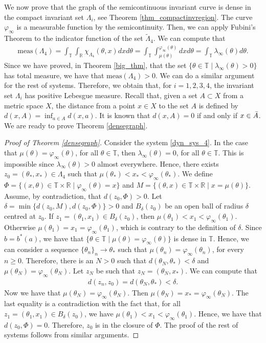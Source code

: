 \documentclass[12pt]{article}
\newcommand{\T}{\mathbb{T}}
\newcommand{\R}{\mathbb{R}}
\theoremstyle{plain}
\theoremstyle{remark}
\theoremstyle{definition}
\begin{document}
We now prove that the graph of the semicontinuous invariant curve is dense in the compact invariant set $\Lambda_i$, see Theorem \ref{thm_compactinvregion}. The curve $\varphi_\infty$ is a measurable function by the semicontinuity. Then, we can apply Fubini's Theorem to the indicator function of the set $\tilde{\Lambda}_4$. We can compute that
\begin{align*}
    \text{meas}(\Lambda_4)=\int_\T\int_{\R}\chi_{\Lambda_4}(\theta,x) dx d\theta = \int_\T\int_{\mu(\theta)}^{\varphi_\infty(\theta)}dx d\theta = \int_\T \lambda_\infty(\theta)d\theta.
\end{align*}
Since we have proved, in Theorem \ref{big_thm}, that the set $\{\theta\in\T\mid \lambda_\infty(\theta)>0\}$ has total measure, we have that $\text{meas}(\Lambda_4)>0$. We can do a similar argument for the rest of systems. Therefore, we obtain that, for $i=1,2,3,4$, the invariant set $\Lambda_i$ has positive Lebesgue measure.
Recall that, given a set $A\subset X$ from a metric space $X$, the distance from a point $x\in X$ to the set $A$ is defined by $d(x,A)=\inf_{a\in A}d(x,a)$. It is known that $d(x,A)=0$ if and only if $x\in\Bar{A}$. We are ready to prove Theorem \ref{densegraph}.
\begin{proof}[Proof of Theorem \ref{densegraph}]
     Consider the system \eqref{dyn_sys_4}. In the case that $\mu(\theta)=\varphi_\infty(\theta)$, for all $\theta\in\T$, then $\lambda_\infty(\theta)=0$, for all $\theta\in\T$. This is impossible since $\lambda_\infty(\theta)>0$ almost everywhere. Hence, there exists $z_0=(\theta_*,x_*)\in\Lambda_4$ such that $\mu(\theta_*)<x_*<\varphi_\infty(\theta_*)$. We define $\Phi=\{(x,\theta)\in\T\times\R\mid\varphi_\infty(\theta)=x\}$ and $M=\{(\theta,x)\in\T\times\R\mid x = \mu(\theta)\}$. Assume, by contradiction, that $d(z_0,\Phi)>0$. Let $\delta=\min\{d(z_0,M),d(z_0,\Phi)\}>0$ and $B_\delta(z_0)$ be an open ball of radius $\delta$ centred at $z_0$. If $z_1=(\theta_1,x_1)\in B_\delta(z_0)$, then $\mu(\theta_1)<x_1<\varphi_\infty(\theta_1)$. Otherwise $\mu(\theta_1)=x_1=\varphi_\infty(\theta_1)$, which is contrary to the definition of $\delta$. Since $b=b^*(a)$, we have that $\{\theta\in\T\mid \mu(\theta)=\varphi_\infty(\theta)\}$ is dense in $\T$. Hence, we can consider a sequence $\{\theta_n\}_n\to\theta_*$ such that $\mu(\theta_n)=\varphi_\infty(\theta_n)$, for every $n\geq0$. Therefore, there is an $N>0$ such that $d(\theta_N,\theta_*)<\delta$ and $\mu(\theta_N)=\varphi_\infty(\theta_N)$. Let $z_N$ be such that $z_N=(\theta_N,x_*)$. We can compute that 
     \begin{align*}
        d(z_n,z_0) = d(\theta_N,\theta_*) < \delta.
     \end{align*}
     Now we have that $\mu(\theta_N)=\varphi_\infty(\theta_N)$. Then $\mu(\theta_N)=x_*=\varphi_\infty(\theta_N)$. The last equality is a contradiction with the fact that, for all $z_1=(\theta_1,x_1)\in B_\delta(z_0)$, we have $\mu(\theta_1)<x_1<\varphi_\infty(\theta_1)$. Hence, we have that $d(z_0,\Phi)=0$. Therefore, $z_0$ is in the closure of $\Phi$. The proof of the rest of systems follows from similar arguments.
\end{proof}
\end{document}
